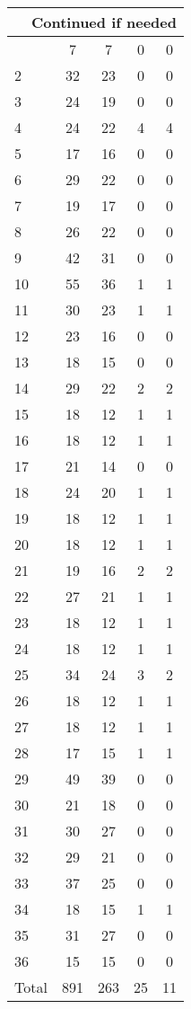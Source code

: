 \begin{center}
\begin{longtable}{l|c|c|c|c}
\hline \multicolumn{5}{|r|}{{Continued if needed}} \\ \hline
\endfoot 
1 & 7 & 7 & 0 & 0\\ \hline
2 & 32 & 23 & 0 & 0\\ \hline
3 & 24 & 19 & 0 & 0\\ \hline
4 & 24 & 22 & 4 & 4\\ \hline
5 & 17 & 16 & 0 & 0\\ \hline
6 & 29 & 22 & 0 & 0\\ \hline
7 & 19 & 17 & 0 & 0\\ \hline
8 & 26 & 22 & 0 & 0\\ \hline
9 & 42 & 31 & 0 & 0\\ \hline
10 & 55 & 36 & 1 & 1\\ \hline
11 & 30 & 23 & 1 & 1\\ \hline
12 & 23 & 16 & 0 & 0\\ \hline
13 & 18 & 15 & 0 & 0\\ \hline
14 & 29 & 22 & 2 & 2\\ \hline
15 & 18 & 12 & 1 & 1\\ \hline
16 & 18 & 12 & 1 & 1\\ \hline
17 & 21 & 14 & 0 & 0\\ \hline
18 & 24 & 20 & 1 & 1\\ \hline
19 & 18 & 12 & 1 & 1\\ \hline
20 & 18 & 12 & 1 & 1\\ \hline
21 & 19 & 16 & 2 & 2\\ \hline
22 & 27 & 21 & 1 & 1\\ \hline
23 & 18 & 12 & 1 & 1\\ \hline
24 & 18 & 12 & 1 & 1\\ \hline
25 & 34 & 24 & 3 & 2\\ \hline
26 & 18 & 12 & 1 & 1\\ \hline
27 & 18 & 12 & 1 & 1\\ \hline
28 & 17 & 15 & 1 & 1\\ \hline
29 & 49 & 39 & 0 & 0\\ \hline
30 & 21 & 18 & 0 & 0\\ \hline
31 & 30 & 27 & 0 & 0\\ \hline
32 & 29 & 21 & 0 & 0\\ \hline
33 & 37 & 25 & 0 & 0\\ \hline
34 & 18 & 15 & 1 & 1\\ \hline
35 & 31 & 27 & 0 & 0\\ \hline
36 & 15 & 15 & 0 & 0\\ \hline
\hline \hline
Total & 891 & 263 & 25 & 11



\end{longtable}
\end{center}

